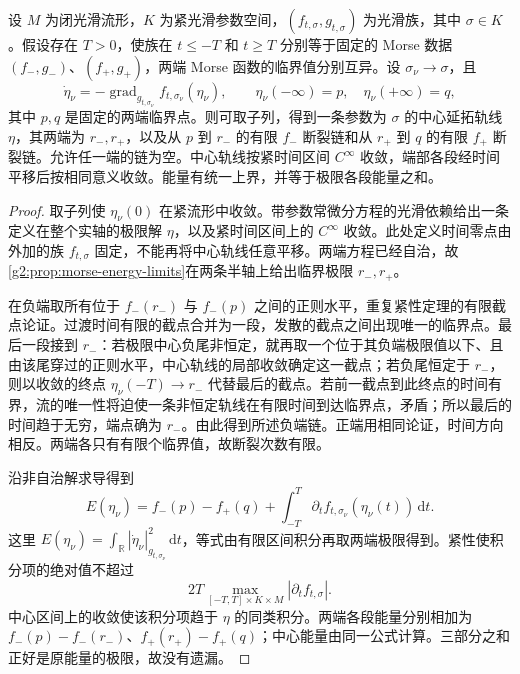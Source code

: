 \begin{lemma}\label{g2:lem:continuation-broken-compactness}
	设 \(M\) 为闭光滑流形，\(K\) 为紧光滑参数空间，\((f_{t,\sigma},g_{t,\sigma})\) 为光滑族，其中 \(\sigma\in K\)。假设存在 \(T>0\)，使族在 \(t\le-T\) 和 \(t\ge T\) 分别等于固定的 Morse 数据 \((f_-,g_-)\)、\((f_+,g_+)\)，两端 Morse 函数的临界值分别互异。设 \(\sigma_\nu\to\sigma\)，且
	\[
		\dot\eta_\nu=-\operatorname{grad}_{g_{t,\sigma_\nu}}f_{t,\sigma_\nu}(\eta_\nu),
		\qquad
		\eta_\nu(-\infty)=p,\quad\eta_\nu(+\infty)=q,
	\]
	其中 \(p,q\) 是固定的两端临界点。则可取子列，得到一条参数为 \(\sigma\) 的中心延拓轨线 \(\eta\)，其两端为 \(r_-,r_+\)，以及从 \(p\) 到 \(r_-\) 的有限 \(f_-\) 断裂链和从 \(r_+\) 到 \(q\) 的有限 \(f_+\) 断裂链。允许任一端的链为空。中心轨线按紧时间区间 \(C^\infty\) 收敛，端部各段经时间平移后按相同意义收敛。能量有统一上界，并等于极限各段能量之和。
\end{lemma}
\begin{proof}
	取子列使 \(\eta_\nu(0)\) 在紧流形中收敛。带参数常微分方程的光滑依赖给出一条定义在整个实轴的极限解 \(\eta\)，以及紧时间区间上的 \(C^\infty\) 收敛。此处定义时间零点由外加的族 \(f_{t,\sigma}\) 固定，不能再将中心轨线任意平移。两端方程已经自治，故\cref{g2:prop:morse-energy-limits}在两条半轴上给出临界极限 \(r_-,r_+\)。

	在负端取所有位于 \(f_-(r_-)\) 与 \(f_-(p)\) 之间的正则水平，重复紧性定理的有限截点论证。过渡时间有限的截点合并为一段，发散的截点之间出现唯一的临界点。最后一段接到 \(r_-\)：若极限中心负尾非恒定，就再取一个位于其负端极限值以下、且由该尾穿过的正则水平，中心轨线的局部收敛确定这一截点；若负尾恒定于 \(r_-\)，则以收敛的终点 \(\eta_\nu(-T)\to r_-\) 代替最后的截点。若前一截点到此终点的时间有界，流的唯一性将迫使一条非恒定轨线在有限时间到达临界点，矛盾；所以最后的时间趋于无穷，端点确为 \(r_-\)。由此得到所述负端链。正端用相同论证，时间方向相反。两端各只有有限个临界值，故断裂次数有限。

	沿非自治解求导得到
	\begin{equation}\label{g2:eq:continuation-energy-identity}
		E(\eta_\nu)
		=f_-(p)-f_+(q)
		+\int_{-T}^{T}\partial_t f_{t,\sigma_\nu}(\eta_\nu(t))\,\mathrm{d}t.
	\end{equation}
	这里 \(E(\eta_\nu)=\int_{\mathbb R}|\dot\eta_\nu|_{g_{t,\sigma_\nu}}^2\,\mathrm{d}t\)，等式由有限区间积分再取两端极限得到。紧性使积分项的绝对值不超过
	\[
		2T\max_{[-T,T]\times K\times M}|\partial_t f_{t,\sigma}|.
	\]
	中心区间上的收敛使该积分项趋于 \(\eta\) 的同类积分。两端各段能量分别相加为 \(f_-(p)-f_-(r_-)\)、\(f_+(r_+)-f_+(q)\)；中心能量由同一公式计算。三部分之和正好是原能量的极限，故没有遗漏。
\end{proof}

